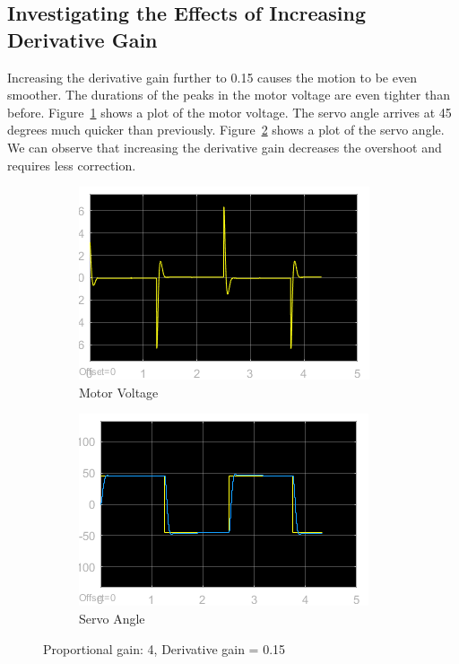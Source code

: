 \documentclass[12pt]{article}
\begin{document}
\subsection*{Investigating the Effects of Increasing Derivative Gain} %
Increasing the derivative gain further to 0.15 causes the motion to be even smoother. The durations of the peaks in the motor voltage are even tighter than before. Figure~\ref{fig:xii_volt} shows a plot of the motor voltage. The servo angle arrives at 45 degrees much quicker than previously. Figure~\ref{fig:xii_angle} shows a plot of the servo angle. We can observe that increasing the derivative gain decreases the overshoot and requires less correction.
\begin{figure}[h!]
    \centering
    \begin{subfigure}[b]{0.49\textwidth}
        \includegraphics[width=\textwidth]{xii_voltage}
        \caption{\label{fig:xii_volt}Motor Voltage}     
    \end{subfigure}
    \begin{subfigure}[b]{0.49\textwidth}
        \includegraphics[width=\textwidth]{xii_angle}
        \caption{\label{fig:xii_angle}Servo Angle} 
    \end{subfigure}
    \caption{\label{fig:xii} Proportional gain: 4, Derivative gain = 0.15}
    \vspace{128in} %
\end{figure}
\end{document}
